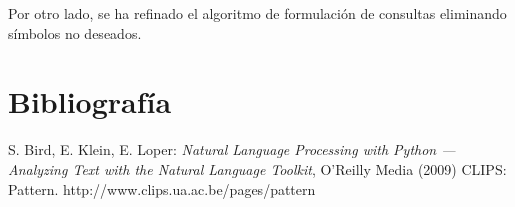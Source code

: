 \documentclass[12pt,a4paper,titlepage]{article}
\begin{document}
Por otro lado, se ha refinado el algoritmo de formulación de consultas eliminando símbolos no deseados.

\newpage
\section{Bibliografía}
\begin{thebibliography}{99}
S. Bird, E. Klein, E. Loper: \emph{Natural Language Processing with Python --- Analyzing Text with the Natural Language Toolkit}, O'Reilly Media (2009)
CLIPS: Pattern. http://www.clips.ua.ac.be/pages/pattern
\end{thebibliography}
\end{document}

